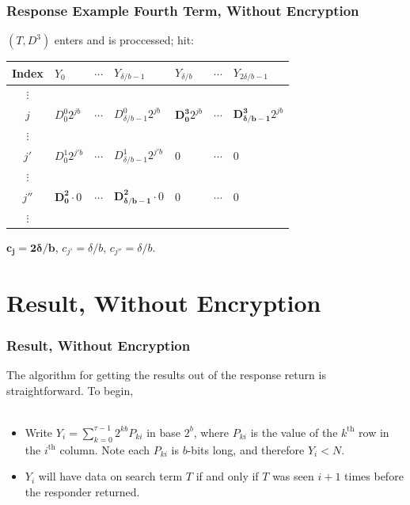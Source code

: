 \documentclass{beamer}
\makeatletter
\DeclareRobustCommand*{\&}{%
  \nfss@text{%
    \fontfamily{LinuxBiolinumT-TLF}%
    \selectfont
    \symbol{`\&}%
  }%
}
\makeatother
\begin{document}
\begin{frame}
  \frametitle{Response Example Fourth Term, Without Encryption}
  $(T, D^3)$ enters and is proccessed; hit:
  \begin{center}
  \begin{tabular}{c  C{1.55cm}  c  C{1.55cm}  C{1.55cm}  c  C{1.55cm}  }
     {\scriptsize Index}             & $Y_0$\qquad            & $\cdots$\qquad         & $Y_{\delta/b-1}$\qquad & $Y_{\delta/b}$\qquad   & $\cdots$\qquad         & $Y_{2\delta/b-1}$\qquad\\\toprule
     $\vdots$ & \\
     {\footnotesize$j$} & {\footnotesize ${D^0_0} 2^{jb}$}                         & $\cdots$ & {\footnotesize ${D^0_{\delta/b-1}} 2^{jb}$}                      & {\footnotesize $\bm{D^3_0} 2^{jb}$}                         & $\cdots$ & {\footnotesize $\bm{D^3_{\delta/b-1}} 2^{jb}$}                         \\
     $\vdots$ & \\
     {\footnotesize$j'$}  & {\footnotesize ${D^1_0} 2^{j'b}$} & $\cdots$                           & {\footnotesize ${D^1_{\delta/b-1}} 2^{j'b}$}                           & 0                      & $\cdots$                           & 0\\
     $\vdots$ & \\
     {\footnotesize$j''$}  & {\footnotesize $\bm{D^2_0} \cdot 0$}  & $\cdots$                           & {\footnotesize $\bm{D^2_{\delta/b-1}} \cdot 0$}     & 0                      & $\cdots$                           & 0\\
    $\vdots$ & \\\bottomrule
  \end{tabular}
  \end{center}
  $\bm{c_{j} = 2\delta/b}$, $c_{j'} = \delta/b$, $c_{j''} = \delta/b$.
\end{frame}

\section{Result, Without Encryption}
\begin{frame}
  \frametitle{Result, Without Encryption}
  The algorithm for getting the results out of the response return is
  straightforward. To begin,\\~\\
  \begin{itemize}
    \item Write $Y_i = \sum_{k=0}^{\tau - 1} 2^{kb}P_{ki}$ in base $2^b$, where
      $P_{ki}$ is the value of the $k^{\text{th}}$ row in the
      $i^{\text{th}}$ column. Note each $P_{ki}$ is $b$-bits long, and therefore
      $Y_i < N$.
    \item $Y_i$ will have data on search term $T$ if and only if $T$ was
      seen $i+1$ times before the responder returned.
  \end{itemize}
\end{frame}
\end{document}
